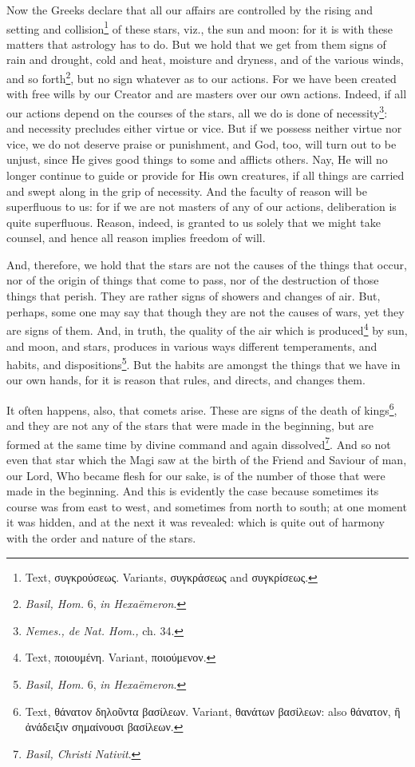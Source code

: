 Now the Greeks declare that all our affairs are controlled by the rising and setting and collision\footnote{Text, \textgreek{συγκρούσεως}. Variants, \textgreek{συγκράσεως} and \textgreek{συγκρίσεως}.} of these stars, viz., the sun and moon: for it is with these matters that astrology has to do. But we hold that we get from them signs of rain and drought, cold and heat, moisture and dryness, and of the various winds, and so forth\footnote{\emph{Basil, Hom.} 6, \emph{in Hexaëmeron}.}, but no sign whatever as to our actions. For we have been created with free wills by our Creator and are masters over our own actions. Indeed, if all our actions depend on the courses of the stars, all we do is done of necessity\footnote{\emph{Nemes., de Nat. Hom., }ch. 34.}: and necessity precludes either virtue or vice. But if we possess neither virtue nor vice, we do not deserve praise or punishment, and God, too, will turn out to be unjust, since He gives good things to some and afflicts others. Nay, He will no longer continue to guide or provide for His own creatures, if all things are carried and swept along in the grip of necessity. And the faculty of reason will be superfluous to us: for if we are not masters of any of our actions, deliberation is quite superfluous. Reason, indeed, is granted to us solely that we might take counsel, and hence all reason implies freedom of will.

And, therefore, we hold that the stars are not the causes of the things that occur, nor of the origin of things that come to pass, nor of the destruction of those things that perish. They are rather signs of showers and changes of air. But, perhaps, some one may say that though they are not the causes of wars, yet they are signs of them. And, in truth, the quality of the air which is produced\footnote{Text, \textgreek{ποιουμένη}. Variant, \textgreek{ποιούμενον}.} by sun, and moon, and stars, produces in various ways different temperaments, and habits, and dispositions\footnote{\emph{Basil, Hom. }6, \emph{in Hexaëmeron}.}. But the habits are amongst the things that we have in our own hands, for it is reason that rules, and directs, and changes them.

It often happens, also, that comets arise. These are signs of the death of kings\footnote{Text, \textgreek{θάνατον δηλοῦντα βασίλεων}. Variant, \textgreek{θανάτων βασίλεων}: also \textgreek{θάνατον, ἢ ἀνάδειξιν σημαίνουσι βασίλεων}.}, and they are not any of the stars that were made in the beginning, but are formed at the same time by divine command and again dissolved\footnote{\emph{Basil, Christi Nativit}.}. And so not even that star which the Magi saw at the birth of the Friend and Saviour of man, our Lord, Who became flesh for our sake, is of the number of those that were made in the beginning. And this is evidently the case because sometimes its course was from east to west, and sometimes from north to south; at one moment it was hidden, and at the next it was revealed: which is quite out of harmony with the order and nature of the stars.


